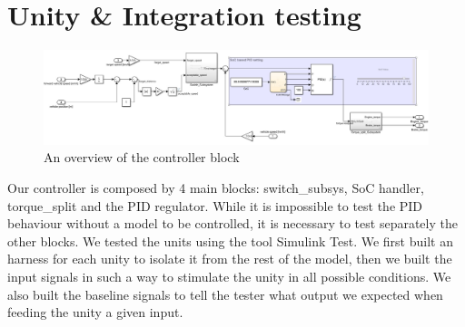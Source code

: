 \documentclass[12pt,a4paper]{report}
\begin{document}
\section{Unity \& Integration testing}
\begin{figure}[!h]
	\centering
	\includegraphics[scale=0.34]{Controller_overview.jpg}
	\caption{An overview of the controller block}
	\label{Controller_overview}
\end{figure}
Our controller is composed by 4 main blocks: switch\_subsys, SoC handler, torque\_split and the PID regulator.
While it is impossible to test the PID behaviour without a model to be controlled, it is necessary to test separately the other blocks.
We tested the units using the tool Simulink Test. We first built an harness for each unity to isolate it from the rest of the model, then we built the input signals in such a way to stimulate the unity in all possible conditions. We also built the baseline signals to tell the tester what output we expected when feeding the unity a given input. 
\newpage
\end{document}
